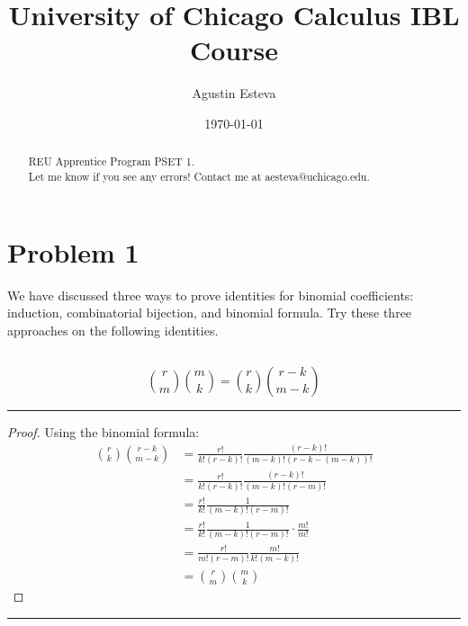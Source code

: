 \documentclass[openany, amssymb, psamsfonts]{amsart}
\title{University of Chicago Calculus IBL Course}
\author{Agustin Esteva}
\date{\today}
\theoremstyle{definition}
\numberwithin{equation}{section}
\begin{document}
\begin{abstract}

REU Apprentice Program PSET 1.\\ Let me know if you see any errors! Contact me at aesteva@uchicago.edu.


\end{abstract}

\maketitle

\tableofcontents

\setcounter{section}{1}
\newpage
\section*{Problem 1}
We have discussed three ways to prove identities for binomial coefficients: induction, combinatorial bijection, and binomial formula. Try these three approaches on the following identities. 
\subsection{}
\[\binom{r}{m}\binom{m}{k} = \binom{r}{k} \binom{r-k}{m-k}\]
\vspace{4pt}     \hrule   \vspace{4pt}\begin{proof}
Using the binomial formula:
\begin{align*}
\binom{r}{k} \binom{r-k}{m-k} &= \frac{r!}{k!(r-k)!}\frac{(r-k)!}{(m-k)! (r-k - (m-k))!}\\
&= \frac{r!}{k!(r-k)!}\frac{(r-k)!}{(m-k)! (r-m)!}\\
&= \frac{r!}{k!}\frac{1}{(m-k)! (r-m)!}\\
&= \frac{r!}{k!}\frac{1}{(m-k)! (r-m)!} \cdot \frac{m!}{m!}\\
&= \frac{r!}{m!(r-m)!}\frac{m!}{k!(m-k)! }\\
&= \binom{r}{m} \binom{m}{k}
\end{align*}
\end{proof}\vspace{4pt}     \hrule   \vspace{4pt}
\end{document}
